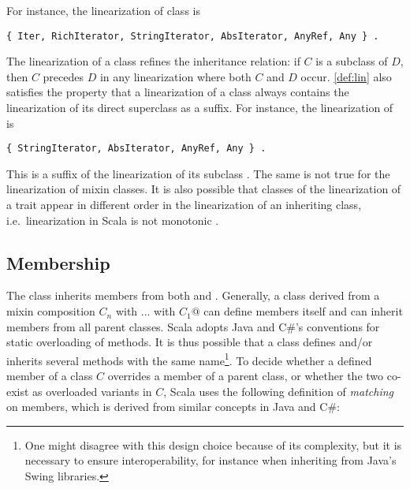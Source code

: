 \documentclass[a4paper,11pt,twoside]{article}
\begin{document}
For instance, the linearization of class \lstinline@Iter@ is
\begin{lstlisting}
{ Iter, RichIterator, StringIterator, AbsIterator, AnyRef, Any } .
\end{lstlisting}
The linearization of a class refines the inheritance relation: if
$C$ is a subclass of $D$, then $C$ precedes $D$ in any linearization
where both $C$ and $D$ occur.
\ref{def:lin} also satisfies the property that a linearization
of a class always contains the linearization of its direct superclass
as a suffix.  For instance, the linearization of
\lstinline@StringIterator@ is
\begin{lstlisting}
{ StringIterator, AbsIterator, AnyRef, Any } .
\end{lstlisting}
This is a suffix of the linearization of its subclass \lstinline@Iter@.
The same is not true for the linearization of mixin classes.
It is also possible that classes of the linearization of a trait
appear in different order in the linearization of an inheriting class, i.e.\ 
linearization in Scala is not monotonic \cite{c3-dylan}.

\subsection*{Membership}

The \lstinline@Iter@ class inherits members from both
\lstinline@StringIterator@ and \lstinline@RichIterator@. Generally, a
class derived from a mixin composition 
\lstinline@$C_n$ with ... with $C_1$@ can define members itself and can
inherit members from all parent classes. Scala adopts Java and C\#'s
conventions for static overloading of methods. It is thus possible
that a class defines and/or inherits several methods with the same
name\footnote{One might disagree with this design choice because of its
complexity, but it is necessary to ensure interoperability, for instance
when inheriting from Java's Swing libraries.}.
To decide whether a defined member of a class $C$ overrides a
member of a parent class, or whether the two co-exist as overloaded
variants in $C$, Scala uses the following definition of {\em matching}
on members, which is derived from similar concepts in Java and C\#:
\end{document}

